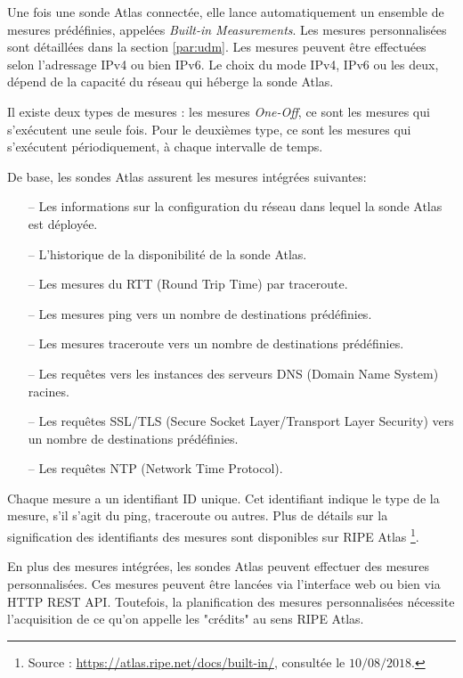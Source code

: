 Une fois une sonde  Atlas connectée, elle lance automatiquement un ensemble de mesures prédéfinies, appelées \textit{Built-in Measurements}. Les mesures personnalisées sont détaillées dans la section \ref{par:udm}. Les mesures peuvent être effectuées selon l'adressage IPv4 ou bien IPv6. Le choix du mode  IPv4,  IPv6 ou les deux, dépend de la capacité du réseau qui héberge la sonde  Atlas.  

Il existe deux types de mesures : les mesures \textit{One-Off}, ce sont les mesures qui s'exécutent une seule fois. Pour le deuxièmes type, ce sont les mesures qui s'exécutent   périodiquement, à chaque intervalle de temps. 

De base, les sondes Atlas assurent les mesures intégrées  suivantes: 

\begin{itemize}
	\item[--] Les informations sur la configuration du réseau dans lequel la sonde Atlas est déployée.
	\item[--] L'historique de la disponibilité de la sonde Atlas.
	\item[--] Les mesures du  RTT (Round Trip Time) par traceroute.
	\item[--] Les mesures ping vers un nombre de destinations prédéfinies.
	\item[--] Les mesures traceroute vers un nombre de destinations prédéfinies.
	\item[--] Les requêtes vers les instances des serveurs DNS (Domain Name System) racines.
	\item[--] Les requêtes SSL/TLS (Secure Socket Layer/Transport Layer Security) vers un nombre de destinations prédéfinies.
	\item[--] Les requêtes NTP (Network Time Protocol).
\end{itemize}

Chaque mesure a un identifiant ID unique. Cet identifiant indique le type de la mesure, s'il s'agit du ping, traceroute ou autres. Plus de détails sur la signification des identifiants des mesures sont disponibles sur RIPE Atlas \footnote{Source : \url{https://atlas.ripe.net/docs/built-in/}, consultée le $10/08/2018$.}.

En plus des mesures intégrées, les sondes Atlas peuvent effectuer des mesures personnalisées. Ces mesures peuvent être lancées via l'interface web \cite{create-UDM} ou bien via  HTTP REST API. Toutefois, la planification des  mesures personnalisées nécessite l'acquisition de ce qu'on appelle les "crédits" au sens RIPE Atlas.  


